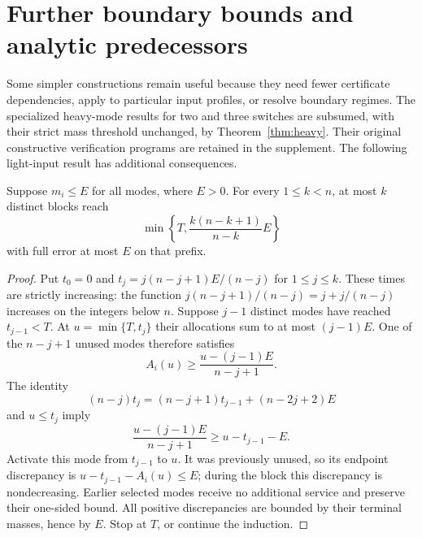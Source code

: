 \section{Further boundary bounds and analytic predecessors}
\label{sec:predecessors}

Some simpler constructions remain useful because they need fewer certificate
dependencies, apply to particular input profiles, or resolve boundary regimes.
The specialized heavy-mode results for two and three switches are subsumed,
with their strict mass threshold unchanged, by Theorem~\ref{thm:heavy}.
Their original constructive verification programs are retained in the
supplement. The following light-input result has additional consequences.

\begin{lemma}\label{lem:all-light}
Suppose $m_i\le E$ for all modes, where $E>0$. For every $1\le k<n$,
at most $k$ distinct blocks reach
\begin{equation}\label{eq:all-light-reach}
 \min\left\{T,\frac{k(n-k+1)}{n-k}E\right\}
\end{equation}
with full error at most $E$ on that prefix.
\end{lemma}
\begin{proof}
Put $t_0=0$ and $t_j=j(n-j+1)E/(n-j)$ for $1\le j\le k$.
These times are strictly increasing: the function
$j(n-j+1)/(n-j)=j+j/(n-j)$ increases on the integers below $n$.
Suppose $j-1$ distinct modes have reached $t_{j-1}<T$. At
$u=\min\{T,t_j\}$ their allocations sum to at most $(j-1)E$.
One of the $n-j+1$ unused modes therefore satisfies
\[
 A_i(u)\ge\frac{u-(j-1)E}{n-j+1}.
\]
The identity
\[
 (n-j)t_j=(n-j+1)t_{j-1}+(n-2j+2)E
\]
and $u\le t_j$ imply
\[
 \frac{u-(j-1)E}{n-j+1}\ge u-t_{j-1}-E.
\]
Activate this mode from $t_{j-1}$ to $u$. It was previously unused,
so its endpoint discrepancy is $u-t_{j-1}-A_i(u)\le E$; during the
block this discrepancy is nondecreasing. Earlier selected modes receive
no additional service and preserve their one-sided bound. All positive
discrepancies are bounded by their terminal masses, hence by $E$.
Stop at $T$, or continue the induction.
\end{proof}

